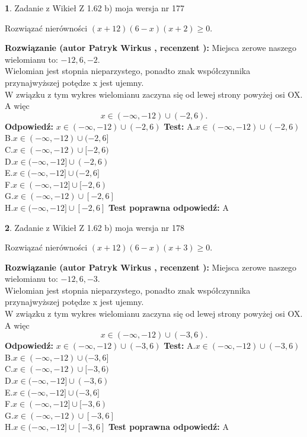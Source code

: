 \documentclass[12pt, a4paper]{article}
\theoremstyle{definition} %
\newtheorem{zad}{}
\newcommand{\zadStart}[1]{\begin{zad}#1\newline}
\newcommand{\zadStop}{\end{zad}}
\newcommand{\rozwStart}[2]{\noindent \textbf{Rozwiązanie (autor #1 , recenzent #2): }\newline}
\newcommand{\rozwStop}{\newline}
\newcommand{\odpStart}{\noindent \textbf{Odpowiedź:}\newline}
\newcommand{\odpStop}{\newline}
\newcommand{\testStart}{\noindent \textbf{Test:}\newline}
\newcommand{\testStop}{\newline}
\newcommand{\kluczStart}{\noindent \textbf{Test poprawna odpowiedź:}\newline}
\newcommand{\kluczStop}{\newline}
\begin{document}
\zadStart{Zadanie z Wikieł Z 1.62 b) moja wersja nr 177}

Rozwiązać nierówności $(x+12)(6-x)(x+2)\ge0$.
\zadStop
\rozwStart{Patryk Wirkus}{}
Miejsca zerowe naszego wielomianu to: $-12, 6, -2$.\\
Wielomian jest stopnia nieparzystego, ponadto znak współczynnika przy\linebreak najwyższej potędze x jest ujemny.\\ W związku z tym wykres wielomianu zaczyna się od lewej strony powyżej osi OX. A więc $$x \in (-\infty,-12) \cup (-2,6).$$
\rozwStop
\odpStart
$x \in (-\infty,-12) \cup (-2,6)$
\odpStop
\testStart
A.$x \in (-\infty,-12) \cup (-2,6)$\\
B.$x \in (-\infty,-12) \cup (-2,6]$\\
C.$x \in (-\infty,-12) \cup [-2,6)$\\
D.$x \in (-\infty,-12] \cup (-2,6)$\\
E.$x \in (-\infty,-12] \cup (-2,6]$\\
F.$x \in (-\infty,-12] \cup [-2,6)$\\
G.$x \in (-\infty,-12) \cup [-2,6]$\\
H.$x \in (-\infty,-12] \cup [-2,6]$
\testStop
\kluczStart
A
\kluczStop



\zadStart{Zadanie z Wikieł Z 1.62 b) moja wersja nr 178}

Rozwiązać nierówności $(x+12)(6-x)(x+3)\ge0$.
\zadStop
\rozwStart{Patryk Wirkus}{}
Miejsca zerowe naszego wielomianu to: $-12, 6, -3$.\\
Wielomian jest stopnia nieparzystego, ponadto znak współczynnika przy\linebreak najwyższej potędze x jest ujemny.\\ W związku z tym wykres wielomianu zaczyna się od lewej strony powyżej osi OX. A więc $$x \in (-\infty,-12) \cup (-3,6).$$
\rozwStop
\odpStart
$x \in (-\infty,-12) \cup (-3,6)$
\odpStop
\testStart
A.$x \in (-\infty,-12) \cup (-3,6)$\\
B.$x \in (-\infty,-12) \cup (-3,6]$\\
C.$x \in (-\infty,-12) \cup [-3,6)$\\
D.$x \in (-\infty,-12] \cup (-3,6)$\\
E.$x \in (-\infty,-12] \cup (-3,6]$\\
F.$x \in (-\infty,-12] \cup [-3,6)$\\
G.$x \in (-\infty,-12) \cup [-3,6]$\\
H.$x \in (-\infty,-12] \cup [-3,6]$
\testStop
\kluczStart
A
\kluczStop
\end{document}

